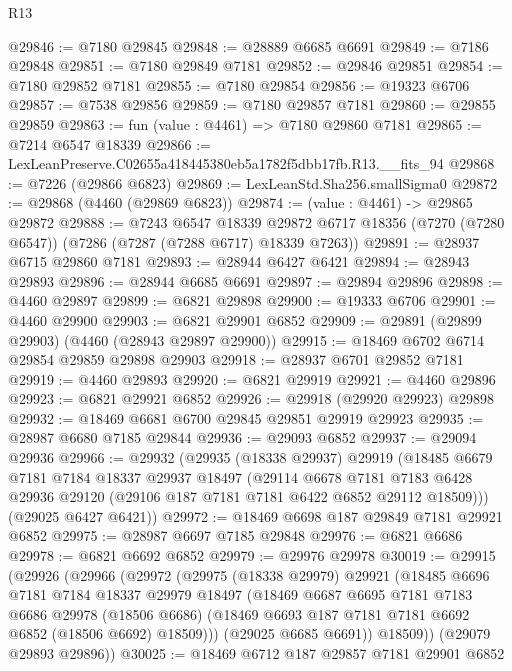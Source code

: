 \begin{lexlean}{R13}
\begin{coremodule}
@29846 := @7180 @29845
@29848 := @28889 @6685 @6691
@29849 := @7186 @29848
@29851 := @7180 @29849 @7181
@29852 := @29846 @29851
@29854 := @7180 @29852 @7181
@29855 := @7180 @29854
@29856 := @19323 @6706
@29857 := @7538 @29856
@29859 := @7180 @29857 @7181
@29860 := @29855 @29859
@29863 := fun (value : @4461) => @7180 @29860 @7181
@29865 := @7214 @6547 @18339
@29866 := LexLeanPreserve.C02655a418445380eb5a1782f5dbb17fb.R13.__fits_94
@29868 := @7226 (@29866 @6823)
@29869 := LexLeanStd.Sha256.smallSigma0
@29872 := @29868 (@4460 (@29869 @6823))
@29874 := (value : @4461) -> @29865 @29872
@29888 := @7243
    @6547
    @18339
    @29872
    @6717
    @18356
    (@7270 (@7280 @6547))
    (@7286 (@7287 (@7288 @6717) @18339 @7263))
@29891 := @28937 @6715 @29860 @7181
@29893 := @28944 @6427 @6421
@29894 := @28943 @29893
@29896 := @28944 @6685 @6691
@29897 := @29894 @29896
@29898 := @4460 @29897
@29899 := @6821 @29898
@29900 := @19333 @6706
@29901 := @4460 @29900
@29903 := @6821 @29901 @6852
@29909 := @29891 (@29899 @29903) (@4460 (@28943 @29897 @29900))
@29915 := @18469 @6702 @6714 @29854 @29859 @29898 @29903
@29918 := @28937 @6701 @29852 @7181
@29919 := @4460 @29893
@29920 := @6821 @29919
@29921 := @4460 @29896
@29923 := @6821 @29921 @6852
@29926 := @29918 (@29920 @29923) @29898
@29932 := @18469 @6681 @6700 @29845 @29851 @29919 @29923
@29935 := @28987 @6680 @7185 @29844
@29936 := @29093 @6852
@29937 := @29094 @29936
@29966 := @29932
    (@29935
      (@18338 @29937)
      @29919
      (@18485
        @6679
        @7181
        @7184
        @18337
        @29937
        @18497
        (@29114
          @6678
          @7181
          @7183
          @6428
          @29936
          @29120
          (@29106 @187 @7181 @7181 @6422 @6852 @29112 @18509)))
      (@29025 @6427 @6421))
@29972 := @18469 @6698 @187 @29849 @7181 @29921 @6852
@29975 := @28987 @6697 @7185 @29848
@29976 := @6821 @6686
@29978 := @6821 @6692 @6852
@29979 := @29976 @29978
@30019 := @29915
    (@29926
      (@29966
        (@29972
          (@29975
            (@18338 @29979)
            @29921
            (@18485
              @6696
              @7181
              @7184
              @18337
              @29979
              @18497
              (@18469
                @6687
                @6695
                @7181
                @7183
                @6686
                @29978
                (@18506 @6686)
                (@18469 @6693 @187 @7181 @7181 @6692 @6852 (@18506 @6692) @18509)))
            (@29025 @6685 @6691))
          @18509))
      (@29079 @29893 @29896))
@30025 := @18469 @6712 @187 @29857 @7181 @29901 @6852

\end{coremodule}
\end{lexlean}
